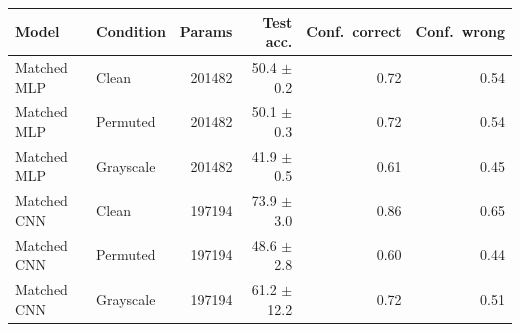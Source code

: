 \begin{tabular}{llrrrr}
\hline
Model & Condition & Params & Test acc. & Conf.\ correct & Conf.\ wrong \\
\hline
Matched MLP & Clean & 201482 & 50.4 $\pm$ 0.2 & 0.72 & 0.54 \\
Matched MLP & Permuted & 201482 & 50.1 $\pm$ 0.3 & 0.72 & 0.54 \\
Matched MLP & Grayscale & 201482 & 41.9 $\pm$ 0.5 & 0.61 & 0.45 \\
Matched CNN & Clean & 197194 & 73.9 $\pm$ 3.0 & 0.86 & 0.65 \\
Matched CNN & Permuted & 197194 & 48.6 $\pm$ 2.8 & 0.60 & 0.44 \\
Matched CNN & Grayscale & 197194 & 61.2 $\pm$ 12.2 & 0.72 & 0.51 \\
\hline
\end{tabular}
